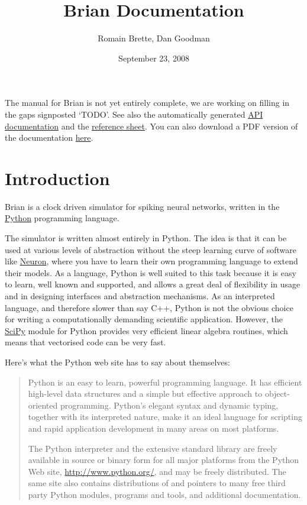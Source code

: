 \documentclass[letterpaper,10pt]{manual}
\title{Brian Documentation}
\date{September 23, 2008}
\author{Romain Brette, Dan Goodman}
\begin{document}
\maketitle
\tableofcontents



The manual for Brian is not yet entirely complete, we are working on filling in the gaps signposted `TODO'.
See also the automatically generated \href{http://brian.di.ens.fr/docs/api/}{API documentation} and
the \href{http://brian.di.ens.fr//BrianReference.pdf}{reference sheet}. You can also download a PDF
version of the documentation \href{http://brian.di.ens.fr/docs/Brian.pdf}{here}.

\resetcurrentobjects


\chapter{Introduction}

Brian is a clock driven simulator for spiking neural networks, written in the \href{http://www.python.org}{Python} programming language.

The simulator is written almost entirely in Python. The idea is that
it can be used at various levels
of abstraction without the steep learning curve of software like \href{http://www.neuron.yale.edu/neuron/}{Neuron}, where you have to learn their
own programming language to extend their models. As a language, Python is well suited to this task
because it is easy to learn, well known and supported, and allows a great deal of flexibility in usage
and in designing interfaces and abstraction mechanisms. As an interpreted language, and therefore slower
than say C++, Python is not the obvious choice for writing a computationally demanding scientific
application. However, the \href{http://www.scipy.org/}{SciPy} module for Python provides very efficient linear algebra routines, which
means that vectorised code can be very fast.

Here's what the Python web site has to say about themselves:
\begin{quote}

Python is an easy to learn, powerful programming language. It has efficient
high-level data structures and a simple but effective approach to
object-oriented programming. Python's elegant syntax and dynamic typing,
together with its interpreted nature, make it an ideal language for
scripting and rapid application development in many areas on most platforms.

The Python interpreter and the extensive standard library are freely
available in source or binary form for all major platforms from the
Python Web site, \href{http://www.python.org/}{http://www.python.org/}, and may be freely distributed.
The same site also contains distributions of and pointers to many free
third party Python modules, programs and tools, and additional documentation.
\end{quote}
\end{document}
